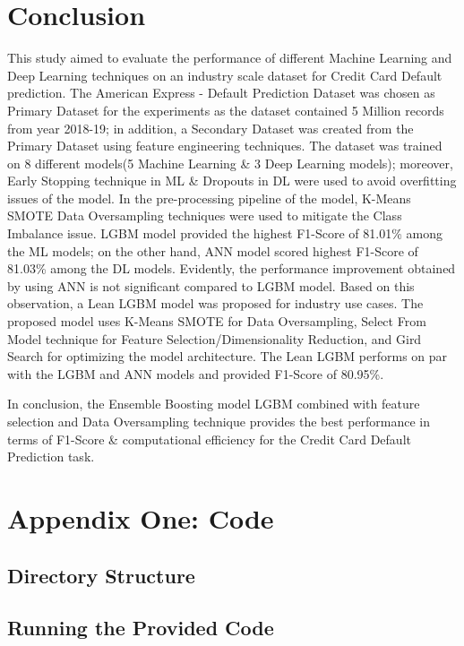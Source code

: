 \documentclass[twoside,11pt,a4paper]{article}
\begin{document}
\section{Conclusion}\label{sec:conclusion}
This study aimed to evaluate the performance of different Machine Learning and Deep Learning techniques on an industry scale dataset for Credit Card Default prediction. The American Express - Default Prediction Dataset \citep{amex-default-prediction-dataset} was chosen as Primary Dataset for the experiments as the dataset contained 5 Million records from year 2018-19; in addition, a Secondary Dataset was created from the Primary Dataset using feature engineering techniques. The dataset was trained on 8 different models(5 Machine Learning \& 3 Deep Learning models); moreover, Early Stopping technique in \acs{ML} \& Dropouts in \acs{DL} were used to avoid overfitting issues of the model. In the pre-processing pipeline of the model, K-Means \acs{SMOTE} Data Oversampling techniques were used to mitigate the Class Imbalance issue. \acs{LGBM} model provided the highest F1-Score of 81.01\% among the \acs{ML} models; on the other hand, \acs{ANN} model scored highest F1-Score of 81.03\% among the \acs{DL} models. Evidently, the performance improvement obtained by using \acs{ANN} is not significant compared to \acs{LGBM} model. Based on this observation, a Lean \acs{LGBM} model was proposed for industry use cases. The proposed model uses K-Means \acs{SMOTE} for Data Oversampling, Select From Model technique for Feature Selection/Dimensionality Reduction, and Gird Search for optimizing the model architecture. The Lean \acs{LGBM} performs on par with the \acs{LGBM} and \acs{ANN} models and provided F1-Score of 80.95\%. 

In conclusion,  the Ensemble Boosting model \acs{LGBM} combined with feature selection and Data Oversampling technique provides the best performance in terms of F1-Score \& computational efficiency for the Credit Card Default Prediction task.



\vfill
\clearpage
\lhead{}\rhead{}
{}
 


\vfill
\clearpage
\section{Appendix One: Code}

\subsection{Directory Structure} 

\subsection{Running the Provided Code}

\clearpage
\end{document}
